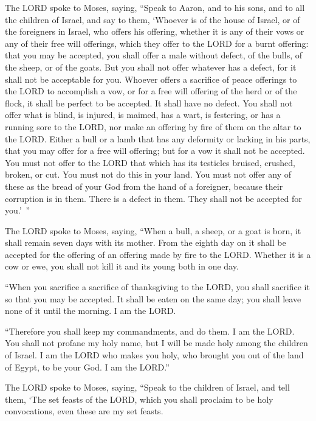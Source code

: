 \myverse{}The LORD spoke to Moses, saying,
\myverse{}“Speak to Aaron, and to his sons, and to all the children of Israel, and
say to them, ‘Whoever is of the house of Israel, or of the foreigners in Israel, who offers his offering,
whether it is any of their vows or any of their free will offerings, which they offer to the LORD for
a burnt offering:
\myverse{}that you may be accepted, you shall offer a male without defect, of the bulls,
of the sheep, or of the goats.
\myverse{}But you shall not offer whatever has a defect, for it shall not be acceptable
for you.
\myverse{}Whoever offers a sacrifice of peace offerings to the LORD to accomplish a
vow, or for a free will offering of the herd or of the flock, it shall be perfect to be accepted. It shall
have no defect.
\myverse{}You shall not offer what is blind, is injured, is maimed, has a wart, is
festering, or has a running sore to the LORD, nor make an offering by fire of them on the altar to the
LORD.
\myverse{}Either a bull or a lamb that has any deformity or lacking in his parts, that
you may offer for a free will offering; but for a vow it shall not be accepted.
\myverse{}You must not offer to the LORD that which has its testicles bruised, crushed,
broken, or cut. You must not do this in your land.
\myverse{}You must not offer any of these as the bread of your God from the hand of
a foreigner, because their corruption is in them. There is a defect in them. They shall not be accepted
for you.’ ”


\myverse{}The LORD spoke to Moses, saying,
\myverse{}“When a bull, a sheep, or a goat is born, it shall remain seven days with
its mother. From the eighth day on it shall be accepted for the offering of an offering made by fire to
the LORD.
\myverse{}Whether it is a cow or ewe, you shall not kill it and its young both in one
day.


\myverse{}“When you sacrifice a sacrifice of thanksgiving to the LORD,
you shall sacrifice it so that you may be accepted.
\myverse{}It shall be eaten on the same day; you shall leave none of it until the morning.
I am the LORD.


\myverse{}“Therefore you shall keep my commandments, and do them. I am
the LORD.
\myverse{}You shall not profane my holy name, but I will be made holy among the children
of Israel. I am the LORD who makes you holy,
\myverse{}who brought you out of the land of Egypt, to be your God. I am the LORD.”


\mychapter{} \myverse*{}The LORD spoke to Moses, saying,
\myverse{}“Speak to the children of Israel, and tell them, ‘The set feasts of the LORD,
which you shall proclaim to be holy convocations, even these are my set feasts.


